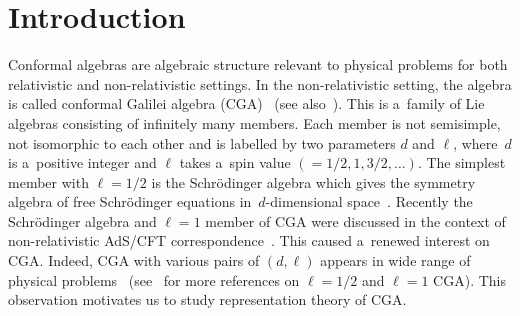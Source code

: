 \documentclass[pdftex]{sigma}
\numberwithin{equation}{section}
\begin{document}


\section{Introduction}

Conformal algebras are algebraic structure relevant to physical problems for both relativistic and non-relativistic
settings.
In the non-relativistic setting, the algebra is called conformal Galilei algebra (CGA)~\cite{NdORM1} (see
also~\cite{HavPre}).
This is a~family of Lie algebras consisting of inf\/initely many members.
Each member is not semisimple, not isomorphic to each other and is labelled by two parameters $d$ and $\ell$,
where~$d$ is a~positive integer and $ \ell $ takes a~spin value $(=1/2, 1, 3/2, \dots)$.
The simplest member with $\ell=1/2$ is the Schr\"odinger algebra which gives the symmetry algebra of free Schr\"odinger
equations in~$d$-dimensional space~\cite{Hagen, Nie}.
Recently the Schr\"odinger algebra and $ \ell=1$ member of CGA were discussed in the context of non-relativistic AdS/CFT
correspondence~\cite{AlDaVa,BaGop,BaMcG,MT, Son}.
This caused a~renewed interest on CGA.
Indeed, CGA with various pairs of $(d,\ell)$ appears in wide range of physical
problems~\cite{AndGaGoMa,AndGo,AndGo2,AndGoKD,AndGoKoMa,AndGoMas,GalaMas,GalaMas2,GalaMas3,Henkel,HuJa,LSZ,NisSon,StZak,ZhangHor}
(see~\cite{AiIsKi} for more references on $\ell=1/2 $ and $ \ell =1 $ CGA).
This observation motivates us to study representation theory of CGA.
\end{document}
